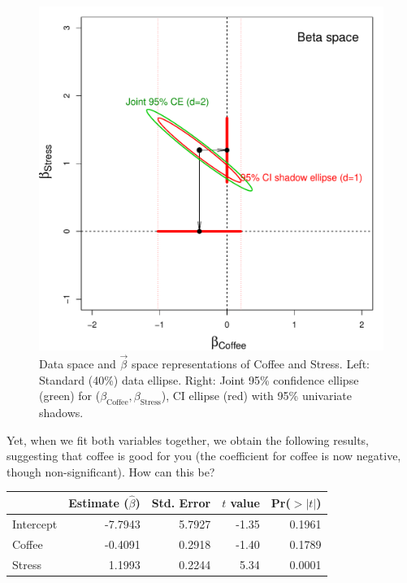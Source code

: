 \begin{figure}[htb]
\begin{minipage}[c]{.485\textwidth}
   \includegraphics[width=1\linewidth,clip]{fig/vis-reg-coffee12b}
  \end{minipage}
  \caption{Data space and $\vec{\beta}$ space representations of Coffee and Stress.
   Left: Standard (40\%) data ellipse. Right: Joint 95\% confidence ellipse (green) for
   ($\beta_{\mathrm{Coffee}}, \beta_{\mathrm{Stress}}$), CI ellipse (red) with 95\% univariate shadows.
  }%
  \label{fig:vis-reg-coffee12}
\end{figure}
Yet, when we fit both variables together, we obtain the following results,
suggesting that coffee is good for you (the coefficient for coffee is now
negative, though non-significant).  How can this be?

\begin{center}
\begin{tabular}{lrrrr}
 & Estimate ($\widehat{\beta}$) & Std. Error & $t$ value & Pr($>|t|$) \\ 
  \hline
  Intercept & -7.7943 & 5.7927 & -1.35 & 0.1961 \\ 
  Coffee & -0.4091 & 0.2918 & -1.40 & 0.1789 \\ 
  Stress & 1.1993 & 0.2244 & 5.34 & 0.0001 \\ 
   \hline
\end{tabular}
\end{center}


